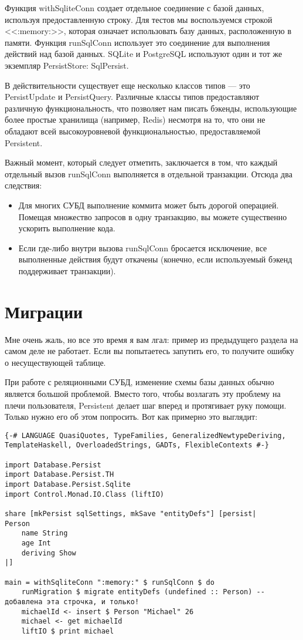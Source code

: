 Функция withSqliteConn создает отдельное соединение с базой данных, используя предоставленную строку. Для тестов мы воспользуемся строкой <<:memory:>>, которая означает использовать базу данных, расположенную в памяти. Функция runSqlConn использует это соединение для выполнения действий над базой данных. SQLite и PostgreSQL используют один и тот же экземпляр PersistStore: SqlPersist.

\begin{remark}
В действительности существует еще несколько классов типов --- это PersistUpdate и PersistQuery. Различные классы типов предоставляют различную функциональность, что позволяет нам писать бэкенды, использующие более простые хранилища (например, Redis) несмотря на то, что они не обладают всей высокоуровневой функциональностью, предоставляемой Persistent. 
\end{remark}

Важный момент, который следует отметить, заключается в том, что каждый отдельный вызов runSqlConn выполняется в отдельной транзакции. Отсюда два следствия:

\begin{itemize}
  \item Для многих СУБД выполнение коммита может быть дорогой операцией. Помещая множество запросов в одну транзакцию, вы можете существенно ускорить выполнение кода.
  \item Если где-либо внутри вызова runSqlConn бросается исключение, все выполненные действия будут откачены (конечно, если используемый бэкенд поддерживает транзакции).
\end{itemize}

\section{Миграции} %

Мне очень жаль, но все это время я вам лгал: пример из предыдущего раздела на самом деле не работает. Если вы попытаетесь запутить его, то получите ошибку о несуществующей таблице.

При работе с реляционными СУБД, изменение схемы базы данных обычно является большой проблемой. Вместо того, чтобы возлагать эту проблему на плечи пользователя, Persistent делает шаг вперед и протягивает руку помощи. Только нужно его об этом попросить. Вот как примерно это выглядит:

\begin{lstlisting}
{-# LANGUAGE QuasiQuotes, TypeFamilies, GeneralizedNewtypeDeriving, TemplateHaskell, OverloadedStrings, GADTs, FlexibleContexts #-}

import Database.Persist
import Database.Persist.TH
import Database.Persist.Sqlite
import Control.Monad.IO.Class (liftIO)

share [mkPersist sqlSettings, mkSave "entityDefs"] [persist|
Person
    name String
    age Int
    deriving Show
|]

main = withSqliteConn ":memory:" $ runSqlConn $ do
    runMigration $ migrate entityDefs (undefined :: Person) -- добавлена эта строчка, и только!
    michaelId <- insert $ Person "Michael" 26
    michael <- get michaelId
    liftIO $ print michael
\end{lstlisting}%

